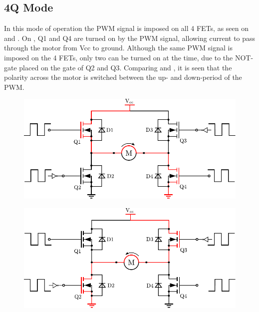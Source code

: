 \subsection{4Q Mode}
In this mode of operation the PWM signal is imposed on all 4 FETs, as seen on  and . On , Q1 and Q4 are turned on by the PWM signal, allowing current to pass through the motor from Vcc to ground. Although the same PWM signal is imposed on the 4 FETs, only two can be turned on at the time, due to the NOT-gate placed on the gate of Q2 and Q3. Comparing  and , it is seen that the polarity across the motor is switched between the up- and down-period of the PWM.\cite{PAndersen}

  \begin{minipage}{\linewidth}
  	\begin{minipage}{0.45\linewidth}
  		\begin{figure}[H]
  			\includegraphics[scale=.53]{figures/HbridgeClockwise4Q.pdf}
  			\centering
  			\vspace{-.4cm}
  			\captionsetup{justification=centering}
  			\label{HbridgeClokwise4Q}
  		\end{figure}
  	\end{minipage}
  	\hspace{0.03\linewidth}
  	\begin{minipage}{0.45\linewidth}
  		\begin{figure}[H]
  			\includegraphics[scale=.53]{figures/HbridgeCounterClockwise4Q.pdf}

\end{figure}
\end{minipage}
\end{minipage}
